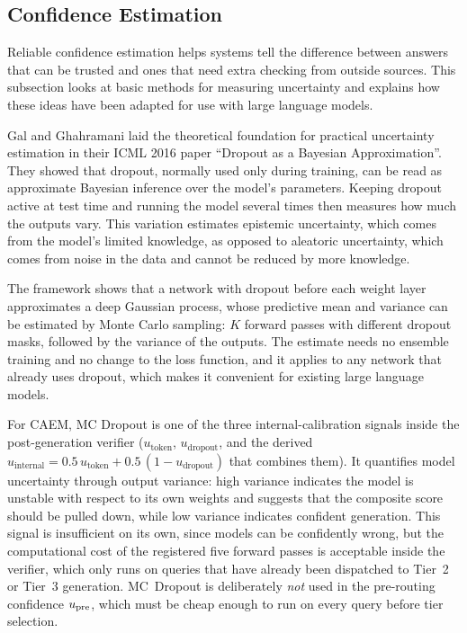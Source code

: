 \subsection{Confidence Estimation}

Reliable confidence estimation helps systems tell the difference between answers that can be trusted and ones that need extra checking from outside sources. This subsection looks at basic methods for measuring uncertainty and explains how these ideas have been adapted for use with large language models.

Gal and Ghahramani \cite{pmlr-v48-gal16} laid the theoretical foundation for practical uncertainty estimation in their ICML 2016 paper ``Dropout as a Bayesian Approximation''. They showed that dropout, normally used only during training, can be read as approximate Bayesian inference over the model's parameters. Keeping dropout active at test time and running the model several times then measures how much the outputs vary. This variation estimates epistemic uncertainty, which comes from the model's limited knowledge, as opposed to aleatoric uncertainty, which comes from noise in the data and cannot be reduced by more knowledge.

The framework shows that a network with dropout before each weight layer approximates a deep Gaussian process, whose predictive mean and variance can be estimated by Monte Carlo sampling: $K$ forward passes with different dropout masks, followed by the variance of the outputs. The estimate needs no ensemble training and no change to the loss function, and it applies to any network that already uses dropout, which makes it convenient for existing large language models.

For CAEM, MC Dropout is one of the three internal-calibration signals inside the post-generation verifier ($u_{\text{token}}$, $u_{\text{dropout}}$, and the derived $u_{\text{internal}} = 0.5\,u_{\text{token}} + 0.5\,(1 - u_{\text{dropout}})$ that combines them). It quantifies model uncertainty through output variance: high variance indicates the model is unstable with respect to its own weights and suggests that the composite score should be pulled down, while low variance indicates confident generation. This signal is insufficient on its own, since models can be confidently wrong, but the computational cost of the registered five forward passes is acceptable inside the verifier, which only runs on queries that have already been dispatched to Tier~2 or Tier~3 generation. MC~Dropout is deliberately \textit{not} used in the pre-routing confidence $u_{\text{pre}}$, which must be cheap enough to run on every query before tier selection.

